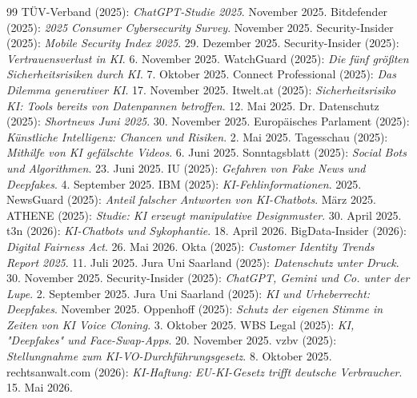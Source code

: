 \documentclass[12pt,a4paper]{article}
\begin{document}
\begin{thebibliography}{99}
		 TÜV-Verband (2025): \emph{ChatGPT-Studie 2025}. November 2025.
		 Bitdefender (2025): \emph{2025 Consumer Cybersecurity Survey}. November 2025.
		 Security-Insider (2025): \emph{Mobile Security Index 2025}. 29. Dezember 2025.
		 Security-Insider (2025): \emph{Vertrauensverlust in KI}. 6. November 2025.
		 WatchGuard (2025): \emph{Die fünf größten Sicherheitsrisiken durch KI}. 7. Oktober 2025.
		 Connect Professional (2025): \emph{Das Dilemma generativer KI}. 17. November 2025.
		 Itwelt.at (2025): \emph{Sicherheitsrisiko KI: Tools bereits von Datenpannen betroffen}. 12. Mai 2025.
		 Dr. Datenschutz (2025): \emph{Shortnews Juni 2025}. 30. November 2025.
		 Europäisches Parlament (2025): \emph{Künstliche Intelligenz: Chancen und Risiken}. 2. Mai 2025.
		 Tagesschau (2025): \emph{Mithilfe von KI gefälschte Videos}. 6. Juni 2025.
		 Sonntagsblatt (2025): \emph{Social Bots und Algorithmen}. 23. Juni 2025.
		 IU (2025): \emph{Gefahren von Fake News und Deepfakes}. 4. September 2025.
		 IBM (2025): \emph{KI-Fehlinformationen}. 2025.
		 NewsGuard (2025): \emph{Anteil falscher Antworten von KI-Chatbots}. März 2025.
		 ATHENE (2025): \emph{Studie: KI erzeugt manipulative Designmuster}. 30. April 2025.
		 t3n (2026): \emph{KI-Chatbots und Sykophantie}. 18. April 2026.
		 BigData-Insider (2026): \emph{Digital Fairness Act}. 26. Mai 2026.
		 Okta (2025): \emph{Customer Identity Trends Report 2025}. 11. Juli 2025.
		 Jura Uni Saarland (2025): \emph{Datenschutz unter Druck}. 30. November 2025.
		 Security-Insider (2025): \emph{ChatGPT, Gemini und Co. unter der Lupe}. 2. September 2025.
		 Jura Uni Saarland (2025): \emph{KI und Urheberrecht: Deepfakes}. November 2025.
		 Oppenhoff (2025): \emph{Schutz der eigenen Stimme in Zeiten von KI Voice Cloning}. 3. Oktober 2025.
		 WBS Legal (2025): \emph{KI, "Deepfakes" und Face-Swap-Apps}. 20. November 2025.
		 vzbv (2025): \emph{Stellungnahme zum KI-VO-Durchführungsgesetz}. 8. Oktober 2025.
		 rechtsanwalt.com (2026): \emph{KI-Haftung: EU-KI-Gesetz trifft deutsche Verbraucher}. 15. Mai 2026.

\end{thebibliography}
\end{document}
